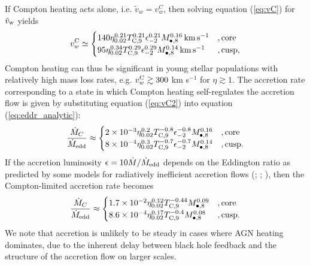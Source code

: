 \documentclass[usenatbib,fleqn]{mn2e}
\begin{document}
If Compton heating acts alone, i.e. $\tilde{v}_{w} = v_{w}^{C}$, then
solving equation (\ref{eq:vC}) for $\tilde{v}_{\rm w}$ yields
\begin{align} v_{w}^{\rm C} \simeq
  \begin{cases} 140 \eta_{0.02}^{0.21}T_{\rm
C,9}^{0.21}\epsilon_{-2}^{0.21} M_{\bullet,8}^{0.16}\,{\rm km\,s^{-1}}
&, \text{core}\\ 95 \eta_{0.02}^{0.34}T_{\rm
C,9}^{0.29}\epsilon_{-2}^{0.29} M_{\bullet,8}^{0.14}\,{\rm km\,s^{-1}}
&, \text{cusp},
  \end{cases}
  \label{eq:vC2}
\end{align} 
Compton heating can thus be significant in young stellar populations
with relatively high mass loss rates, e.g. $v_{w}^{\rm C} \gtrsim 300$
km s$^{-1}$ for $\eta \gtrsim 1$.  The accretion rate
corresponding to a state in which Compton heating self-regulates the accretion flow is given by substituting equation (\ref{eq:vC2}) into equation (\ref{eq:eddr_analytic}):
\begin{align}
\frac{\dot{M}_{C}}{\dot{M}_{\rm edd}} \approx 
\begin{cases} 2\times 10^{-3} \eta_{0.02}^{0.2}T_{\rm
C,9}^{-0.8}\epsilon_{-2}^{-0.8} M_{\bullet,8}^{0.16}
&, \text{core}\\ 8\times 10^{-4} \eta_{0.02}^{0.3}T_{\rm
C,9}^{-0.7}\epsilon_{-2}^{-0.7} M_{\bullet,8}^{0.14}
&, \text{cusp}.
  \end{cases}
  \label{eq:MdotCa}
\end{align}
If the accretion luminosity $\epsilon = 10 \dot{M}/\dot{M}_{\rm edd}$ depends on the Eddington ratio as predicted by some models for
radiatively inefficient accretion flows (\citealt{Narayan&Yi95};
\citealt{Narayan+98}; \citealt{XieYuan:2012a}), then the Compton-limited accretion rate becomes
\begin{align}
\frac{\dot{M}_{C}}{\dot{M}_{\rm edd}} \approx 
\begin{cases} 1.7\times 10^{-2} \eta_{0.02}^{0.12}T_{\rm
C,9}^{-0.44}M_{\bullet,8}^{0.09}
&, \text{core}\\ 8.6\times 10^{-4} \eta_{0.02}^{0.17}T_{\rm
C,9}^{-0.4} M_{\bullet,8}^{0.08}
&, \text{cusp}.
  \end{cases}
  \label{eq:MdotC}
\end{align}
We note that accretion is unlikely to be steady in cases where AGN heating dominates, due to the inherent delay between black hole feedback and the structure of the accretion flow on larger scales.  
\end{document}
